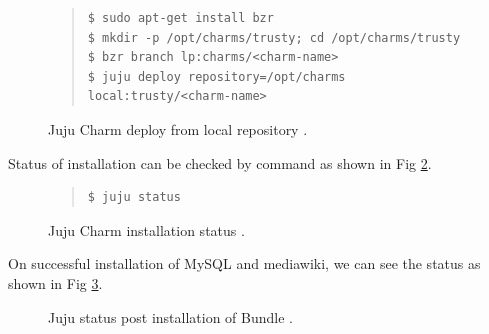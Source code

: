 \documentclass[9pt,twocolumn,twoside]{../../styles/osajnl}
\begin{document}
\begin{figure}
  \caption{Juju Charm deploy from local repository \cite{juju-paper}.}
  \label{fig:charm-deploy-local}
  \begin{quote}
    \begin{Verbatim}
$ sudo apt-get install bzr
$ mkdir -p /opt/charms/trusty; cd /opt/charms/trusty
$ bzr branch lp:charms/<charm-name>
$ juju deploy repository=/opt/charms local:trusty/<charm-name>
    \end{Verbatim}
  \end{quote}
\end{figure}


Status of installation can be checked by command as shown in Fig
\ref{fig:deploy-status}.
\begin{figure}
  \caption{Juju Charm installation status \cite{www-juju}.}
  \label{fig:deploy-status}
  \begin{quote}
    \begin{Verbatim}
$ juju status
    \end{Verbatim}
  \end{quote}
\end{figure}

On successful installation of MySQL and mediawiki, we can see the status
as shown in Fig \ref{fig:juju-mediawiki-status}.

\begin{figure}[htbp]
\centering
{}
\caption{Juju status post installation of Bundle
  \cite{www-jujucharm-documentation}.}
\label{fig:juju-mediawiki-status}
\end{figure}
\end{document}
